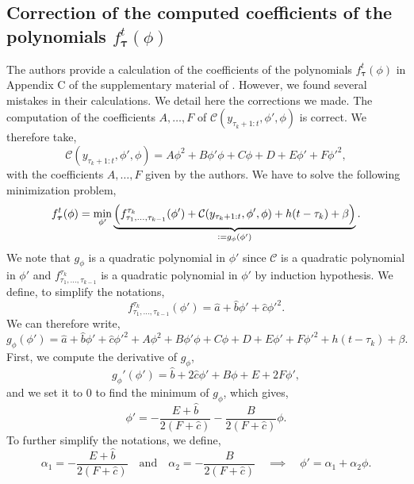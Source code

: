 \documentclass[11pt]{article}
\begin{document}
\subsection{Correction of the computed coefficients of the polynomials $f^t_{\boldsymbol{\tau}}(\phi)$}
The authors provide a calculation of the coefficients of the polynomials $f^t_{\boldsymbol{\tau}}(\phi)$ in Appendix C of the supplementary material of \cite{main_article}. However, we found several mistakes in their calculations. We detail here the corrections we made.
\jump
The computation of the coefficients $A,\dots,F$ of $\mathcal{C}(y_{\tau_k+1:t},\phi',\phi)$ is correct. We therefore take,
\begin{equation}
    \mathcal{C}(y_{\tau_k+1:t},\phi',\phi) = A\phi^2+B\phi'\phi + C\phi + D + E\phi'+F{\phi'}^2,
\end{equation}
with the coefficients $A,\dots,F$ given by the authors.
\jump
We have to solve the following minimization problem,
\begin{equation}
    f_{\boldsymbol{\tau}}^t(\phi) = \min_{\phi'}\underbrace{\left(f^{\tau_k}_{\tau_1,\dots,\tau_{k-1}}(\phi')+\mathcal{C}(y_{\tau_k+1:t},\phi',\phi)+h(t-\tau_k)+\beta\right)}_{\vcentcolon = g_\phi(\phi')}.
\end{equation}
We note that $g_\phi$ is a quadratic polynomial in $\phi'$ since $\mathcal{C}$ is a quadratic polynomial in $\phi'$ and $f^{\tau_k}_{\tau_1,\dots,\tau_{k-1}}$ is a quadratic polynomial in $\phi'$ by induction hypothesis. We define, to simplify the notations,
\begin{equation*}
    f^{\tau_k}_{\tau_1,\dots,\tau_{k-1}}(\phi') = \hat{a} + \hat{b}\phi' + \hat{c}{\phi'}^2.
\end{equation*}
We can therefore write,
\begin{equation*}
    g_\phi(\phi') = \hat{a} + \hat{b}\phi' + \hat{c}{\phi'}^2 + A\phi^2+B\phi'\phi + C\phi + D + E\phi'+F{\phi'}^2 + h(t-\tau_k)+\beta.
\end{equation*}
First, we compute the derivative of $g_\phi$,
\begin{equation*}
    g_\phi'(\phi') = \hat{b} + 2\hat{c}\phi' + B\phi + E + 2F\phi',
\end{equation*}
and we set it to $0$ to find the minimum of $g_\phi$, which gives,
\begin{equation*}
    \phi' = -\frac{E + \hat{b}}{2(F+\hat{c})} - \frac{B}{2(F+\hat{c})}\phi.
\end{equation*}
To further simplify the notations, we define,
\begin{equation*}
    \alpha_1 = -\frac{E + \hat{b}}{2(F+\hat{c})} \quad \text{and} \quad \alpha_2 = - \frac{B}{2(F+\hat{c})} \quad \implies \quad \phi' = \alpha_1 + \alpha_2\phi.
\end{equation*}
\end{document}
